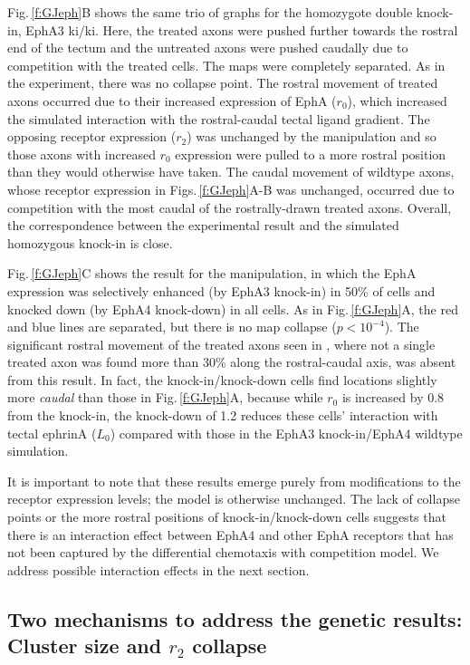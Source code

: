 \documentclass[11pt, a4paper]{article}
\begin{document}
Fig.\,\ref{f:GJeph}B shows the same trio of graphs for the homozygote double knock-in, EphA3 ki/ki. Here, the treated axons were pushed further towards the rostral end of the tectum and the untreated axons were pushed caudally due to competition with the treated cells. 
The maps were completely separated. As in the experiment, there was no collapse point.
The rostral movement of treated axons occurred due to their increased expression of EphA ($r_0$), which increased the simulated interaction with the rostral-caudal tectal ligand gradient. 
The opposing receptor expression ($r_2$) was unchanged by the manipulation and so those axons with increased $r_0$ expression were pulled to a more rostral position than they would otherwise have taken. 
The caudal movement of wildtype axons, whose receptor expression in Figs.\,\ref{f:GJeph}A-B was unchanged, occurred due to competition with the most caudal of the rostrally-drawn treated axons.
Overall, the correspondence between the experimental result and the simulated homozygous knock-in is close.

Fig.\,\ref{f:GJeph}C shows the result for the \citet{reber_relative_2004} manipulation, in which the EphA expression was selectively enhanced (by EphA3 knock-in) in 50\% of cells and knocked down (by EphA4 knock-down) in all cells.
As in Fig.\,\ref{f:GJeph}A, the red and blue lines are separated, but there is no map collapse ($p<10^{-4}$). 
The significant rostral movement of the treated axons seen in \citet{reber_relative_2004}, where not a single treated axon was found more than 30\% along the rostral-caudal axis, was absent from this result. 
In fact, the knock-in/knock-down cells find locations slightly more \emph{caudal} than those in Fig.\,\ref{f:GJeph}A, because while $r_0$ is increased by 0.8 from the knock-in, the knock-down of 1.2 reduces these cells' interaction with tectal ephrinA ($L_0$) compared with those in the EphA3 knock-in/EphA4 wildtype simulation.

It is important to note that these results emerge purely from modifications to the receptor expression levels; the model is otherwise unchanged. 
The lack of collapse points or the more rostral positions of knock-in/knock-down cells suggests that there is an interaction effect between EphA4 and other EphA receptors that has not been captured by the differential chemotaxis with competition model.
We address possible interaction effects in the next section.

\subsection*{Two mechanisms to address the genetic results: Cluster size and $r_2$ collapse}
\end{document}
